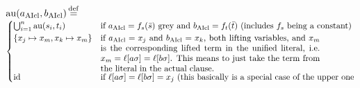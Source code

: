 \documentclass[,%
	paper=a4,%
	DIV10, 
	twoside=false,%
	liststotoc,
	bibtotoc,
	draft=false,%
	numbers=noendperiod
]{scrartcl}
\begin{document}
\begin{defi}[$\aiu$]
$ \operatorname{au} (a_{\operatorname{AIcl}}, b_{\operatorname{AIcl}}) \operatorname{\stackrel{\mathrm{def}}{=}} $\newline $
\begin{cases}
	  \bigcup_{i=1}^n \aiu(s_i, t_i) & \text{if $a\cl=f_s(\bar s)$ grey and $b\cl = f_t(\bar t)$ (includes $f_s$ being a constant)} \\
	\{x_j \mapsto x_m, x_k \mapsto x_m\} & \parbox[t]{.75\textwidth}{if $a\cl = x_j$ and $b\cl = x_k$, both lifting variables, and $x_m$ is the       corresponding lifted term in the unified literal, i.e. $x_m = \lifboth{a\sigma} = \lifboth{b\sigma}$. This means to just take the term from the   literal in the actual clause.}\\
	\id & \text{if $\lifboth{a\sigma} = \lifboth{b\sigma} = x_j$ (this basically is a special case of the upper one}
\end{cases}
$

\end{defi}
\end{document}
